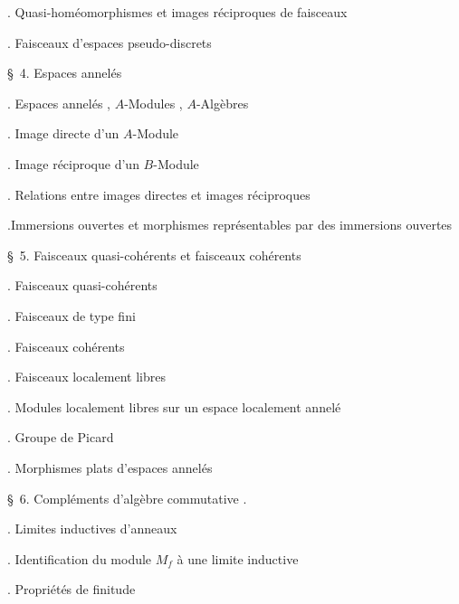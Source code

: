 
\noindent{}. Quasi-homéomorphismes et images réciproques de faisceaux\dotfill

\noindent{}. Faisceaux d'espaces pseudo-discrets\dotfill

\noindent\quad \S\ 4. Espaces annelés\dotfill

\noindent{}. Espaces annelés , $A$-Modules , $A$-Algèbres\dotfill

\noindent{}. Image directe d'un $A$-Module\dotfill

\noindent{}. Image réciproque d'un $B$-Module\dotfill

\noindent{}. Relations entre images directes et images réciproques\dotfill

\noindent{}.Immersions ouvertes et morphismes représentables par des immersions ouvertes \dotfill

\noindent\quad \S\ 5. Faisceaux quasi-cohérents et faisceaux cohérents\dotfill

\noindent{}. Faisceaux quasi-cohérents\dotfill

\noindent{}. Faisceaux de type fini\dotfill

\noindent{}. Faisceaux cohérents\dotfill

\noindent{}. Faisceaux localement libres\dotfill

\noindent{}. Modules localement libres sur un espace localement annelé\dotfill

\noindent{}. Groupe de Picard\dotfill

\noindent{}. Morphismes plats d'espaces annelés\dotfill

\noindent\quad \S\ 6. Compléments d'algèbre commutative .

\noindent{}. Limites inductives d'anneaux\dotfill

\noindent{}. Identification du module $M_f$ à une limite  inductive\dotfill

\noindent{}. Propriétés de finitude\dotfill

